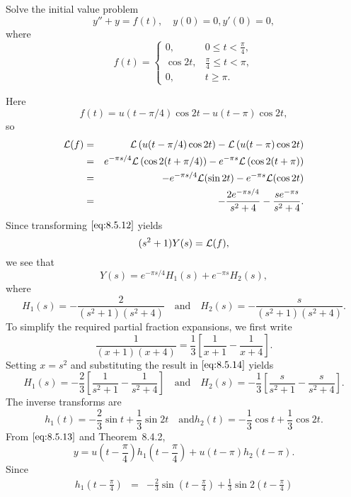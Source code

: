 \documentclass{ximera}
\begin{document}
\begin{example}\label{example:8.5.4}
 Solve the initial value problem
\begin{equation}\label{eq:8.5.12}
y''+y=f(t), \quad   y(0)=0,  y'(0)=0,
\end{equation}
where
$$
f(t)=\left\{\begin{array}{cl}
 0,&0\leq t<\frac{\pi}{4},\\
\cos2t,&\frac{\pi}{4}\leq t<\pi,\\
 0,&t\geq\pi.
\end{array}\right.
$$
\begin{explanation}
Here
$$
f(t)=u(t-\pi/4)\cos2t-u(t-\pi)\cos2t,
$$
so
\begin{eqnarray*}
{\cal L}(f)&=&{\cal L}\left(u(t-\pi/4)\cos2t\right)-{\cal L}\left(u(t-\pi)\cos2t\right)\\
&=&e^{-{\pi s/4}}{\cal L}\left(\cos2(t+\pi/4)\right)-e^{-\pi s}{\cal L}\left(\cos2(t+\pi)\right)\\
&=&-e^{-{\pi s/4}}{\cal L}(\sin2t)-e^{-\pi s}
{\cal L}(\cos2t)\\
&=&-\frac{2e^{-{\pi s/ 4}}}{s^2+4}-\frac{se^{-\pi s}}{s^2+4}.
\end{eqnarray*}
Since transforming $\eqref{eq:8.5.12}$ yields
$$
(s^2+1)Y(s)={\cal L}(f),
$$
we see that
\begin{equation}\label{eq:8.5.13}
Y(s)=e^{-{\pi s/ 4}} H_1(s)+e^{-\pi s} H_2(s),
\end{equation}
where
\begin{equation}\label{eq:8.5.14}
H_1(s)=-\frac{2}{(s^2+1)(s^2+4)}\quad\mbox{and}\quad H_2(s)=-\frac{s}{(s^2+1)(s^2+4)}.
\end{equation}
To simplify the required partial fraction expansions, we first write
$$
\frac{1}{(x+1)(x+4)}=\frac{1}{3}\left[\frac{1}{x+1}-\frac{1}{x+4}\right].
$$
Setting $x=s^2$ and substituting the result in $\eqref{eq:8.5.14}$ yields
$$
H_1(s)=-\frac{2}{3}\left[\frac{1}{s^2+1}-\frac{1}{s^2+4}\right]
\quad\mbox{and}\quad
H_2(s)=-\frac{1}{3}\left[\frac{s}{s^2+1}-\frac{s}{s^2+4}\right].
$$
The inverse transforms are
$$
h_1(t)=-\frac{2}{3}\sin t+\frac{1}{3}\sin2t
\quad\mbox{and}
h_2(t)=-\frac{1}{3}\cos t+\frac{1}{3}\cos2t.
$$
From $\eqref{eq:8.5.13}$ and Theorem~8.4.2,
\begin{equation}\label{eq:8.5.15}
y=u\left(t-\frac{\pi}{4}\right) h_1\left(t-\frac{\pi}{4}\right)+
u(t-\pi) h_2(t-\pi).
\end{equation}
Since
\begin{eqnarray*}
h_1\left(t-\frac{\pi}{4}\right)&=&-\frac{2}{3}\sin\left(t-\frac{\pi}{4}\right)+\frac{1}{3}\sin2\left(t-\frac{\pi}{4}\right)\\

\end{eqnarray*}
\end{explanation}
\end{example}
\end{document}
